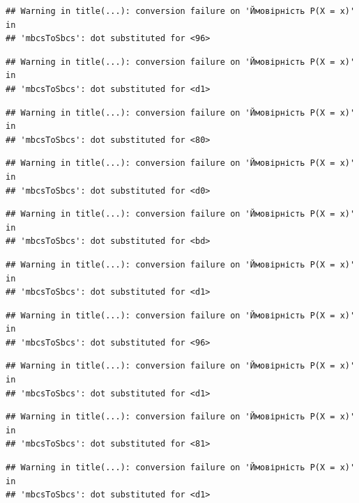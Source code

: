 \documentclass[
  11pt,
]{book}
\begin{document}
\begin{verbatim}
## Warning in title(...): conversion failure on 'Ймовірність P(X = x)' in
## 'mbcsToSbcs': dot substituted for <96>
\end{verbatim}

\begin{verbatim}
## Warning in title(...): conversion failure on 'Ймовірність P(X = x)' in
## 'mbcsToSbcs': dot substituted for <d1>
\end{verbatim}

\begin{verbatim}
## Warning in title(...): conversion failure on 'Ймовірність P(X = x)' in
## 'mbcsToSbcs': dot substituted for <80>
\end{verbatim}

\begin{verbatim}
## Warning in title(...): conversion failure on 'Ймовірність P(X = x)' in
## 'mbcsToSbcs': dot substituted for <d0>
\end{verbatim}

\begin{verbatim}
## Warning in title(...): conversion failure on 'Ймовірність P(X = x)' in
## 'mbcsToSbcs': dot substituted for <bd>
\end{verbatim}

\begin{verbatim}
## Warning in title(...): conversion failure on 'Ймовірність P(X = x)' in
## 'mbcsToSbcs': dot substituted for <d1>
\end{verbatim}

\begin{verbatim}
## Warning in title(...): conversion failure on 'Ймовірність P(X = x)' in
## 'mbcsToSbcs': dot substituted for <96>
\end{verbatim}

\begin{verbatim}
## Warning in title(...): conversion failure on 'Ймовірність P(X = x)' in
## 'mbcsToSbcs': dot substituted for <d1>
\end{verbatim}

\begin{verbatim}
## Warning in title(...): conversion failure on 'Ймовірність P(X = x)' in
## 'mbcsToSbcs': dot substituted for <81>
\end{verbatim}

\begin{verbatim}
## Warning in title(...): conversion failure on 'Ймовірність P(X = x)' in
## 'mbcsToSbcs': dot substituted for <d1>
\end{verbatim}
\end{document}
